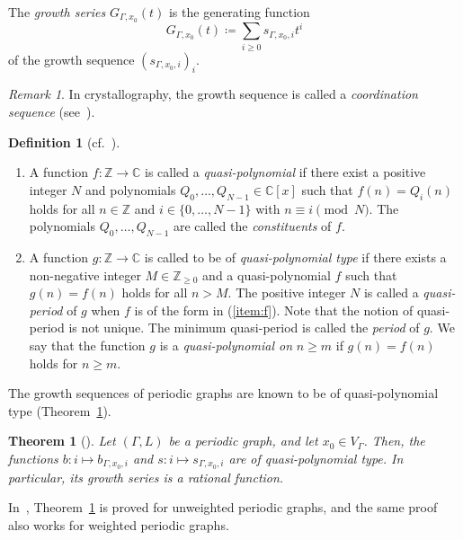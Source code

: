\documentclass[10pt,a4paper]{amsart}
\theoremstyle{plain}
\newtheorem{thm}[cdrthm]{Theorem}
\theoremstyle{definition}
\newtheorem{defi}[cdrthm]{Definition}
\theoremstyle{remark}
\newtheorem{rmk}[cdrthm]{Remark}
\begin{document}
The \textit{growth series} $G_{\Gamma, x_0}(t)$ is the generating function 
\[
G_{\Gamma, x_0}(t) \coloneqq  \sum _{i \ge 0} s_{\Gamma, x_0,i} t^i
\]
of the growth sequence $(s_{\Gamma, x_0,i})_{i}$. 

\begin{rmk}
In crystallography, the growth sequence is called a \textit{coordination sequence} (see~\cite{NSMN21}). 
\end{rmk}

\begin{defi}[{cf.~\cite[Chapter 0]{Sta96}}]\label{defi:qp}  \hfill
\begin{enumerate}
\item \label{item:f}
A function $f: \mathbb{Z} \to \mathbb{C}$ is called a \textit{quasi-polynomial} 
if there exist a positive integer $N$ and polynomials $Q_0, \ldots, Q_{N-1} \in \mathbb{C}[x]$ such that 
$f(n) = Q_i(n)$ holds for all $n \in \mathbb{Z}$ and $i \in \{ 0, \ldots , N-1 \}$ with $n \equiv i \pmod N$. 
The polynomials $Q_0, \ldots, Q_{N-1}$ are called the \textit{constituents} of $f$. 

\item 
A function $g: \mathbb{Z} \to \mathbb{C}$ is called to be of \textit{quasi-polynomial type} if 
there exists a non-negative integer $M \in \mathbb{Z}_{\ge 0}$ and a quasi-polynomial $f$ such that
$g(n) = f(n)$ holds for all $n > M$. 
The positive integer $N$ is called a \textit{quasi-period} of $g$ when $f$ is of the form in (\ref{item:f}). 
Note that the notion of quasi-period is not unique. 
The minimum quasi-period is called the \textit{period} of $g$. 
We say that the function $g$ is a \textit{quasi-polynomial on} $n \ge m$ if 
$g(n) = f(n)$ holds for $n \ge m$. 
\end{enumerate}
\end{defi}

The growth sequences of periodic graphs are known to be of quasi-polynomial type (Theorem~\ref{thm:NSMN}). 
\begin{thm}[{\cite[Theorem 2.2]{NSMN21}}]\label{thm:NSMN}
Let $(\Gamma, L)$ be a periodic graph, and let $x_0 \in V_{\Gamma}$. 
Then, the functions $b: i \mapsto b_{\Gamma, x_0, i}$ and $s: i \mapsto s_{\Gamma, x_0, i}$ are of quasi-polynomial type. 
In particular, its growth series is a rational function. 
\end{thm}

\noindent
In~\cite{NSMN21}, Theorem~\ref{thm:NSMN} is proved for unweighted periodic graphs, 
and the same proof also works for weighted periodic graphs. 
\end{document}

